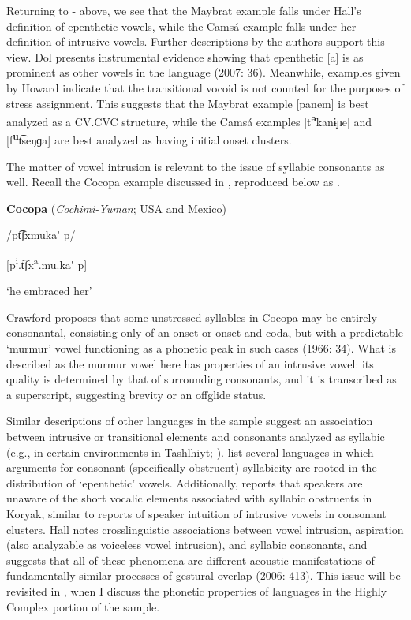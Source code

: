   Returning to - above, we see that the Maybrat example falls under Hall’s definition of epenthetic vowels, while the Camsá example falls under her definition of intrusive vowels. Further descriptions by the authors support this view. Dol presents instrumental evidence showing that epenthetic [a] is as prominent as other vowels in the language (2007: 36). Meanwhile, examples given by Howard indicate that the transitional vocoid is not counted for the purposes of stress assignment. This suggests that the Maybrat example [panem] is best analyzed as a CV.CVC structure, while the Camsá examples [t\textbf{\textsuperscript{ə}}kanɨɲe] and [f\textbf{\textsuperscript{u}}t͡seŋɡa] are best analyzed as having initial onset clusters.

  The matter of vowel intrusion is relevant to the issue of syllabic consonants as well. Recall the Cocopa example discussed in , reproduced below as .

\ea\label{ex:(3.10)}
  \textbf{Cocopa} (\textit{Cochimi-Yuman}; USA and Mexico)

/pt͡ʃxmuka\'{} p/

[p\textsuperscript{i}.t͡ʃx\textsuperscript{a}.mu.ka\'{} p]

\glt ‘he embraced her’

\citep[43]{Crawford1966}
\z

Crawford proposes that some unstressed syllables in Cocopa may be entirely consonantal, consisting only of an onset or onset and coda, but with a predictable ‘murmur’ vowel functioning as a phonetic peak in such cases (1966: 34). What is described as the murmur vowel here has properties of an intrusive vowel: its quality is determined by that of surrounding consonants, and it is transcribed as a superscript, suggesting brevity or an offglide status.

  Similar descriptions of other languages in the sample suggest an association between intrusive or transitional elements and consonants analyzed as syllabic (e.g., in certain environments in Tashlhiyt; \citealt{DellElmedlaoui2002}). \citet{HargusBeavert2006} list several languages in which arguments for consonant (specifically obstruent) syllabicity are rooted in the distribution of ‘epenthetic’ vowels. Additionally, \citet[185-6]{Bell1978a} reports that speakers are unaware of the short vocalic elements associated with syllabic obstruents in Koryak, similar to reports of speaker intuition of intrusive vowels in consonant clusters. Hall notes crosslinguistic associations between vowel intrusion, aspiration (also analyzable as voiceless vowel intrusion), and syllabic consonants, and suggests that all of these phenomena are different acoustic manifestations of fundamentally similar processes of gestural overlap (2006: 413). This issue will be revisited in , when I discuss the phonetic properties of languages in the Highly Complex portion of the sample.

